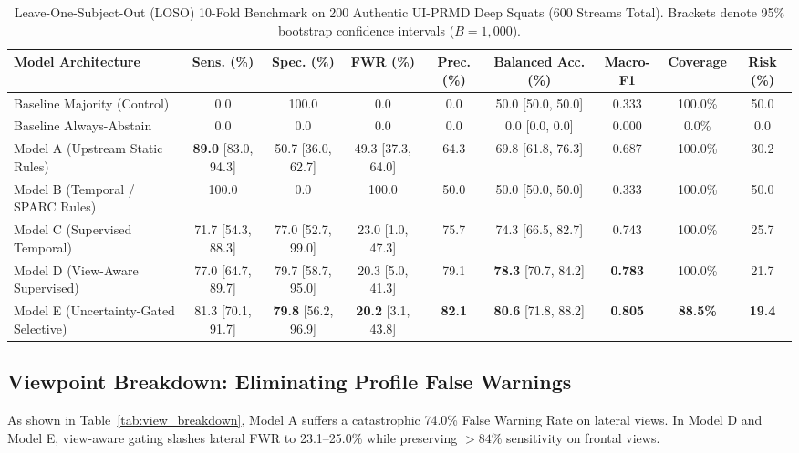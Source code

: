 \documentclass[10pt,journal,compsoc]{IEEEtran}
\begin{document}
\begin{table}[t]
\centering
\caption{Leave-One-Subject-Out (LOSO) 10-Fold Benchmark on 200 Authentic UI-PRMD Deep Squats (600 Streams Total). Brackets denote 95\% bootstrap confidence intervals ($B=1,000$).}
\label{tab:loso_benchmark}
\small
\begin{tabular}{lcccccccc}
\toprule
\textbf{Model Architecture} & \textbf{Sens. (\%)} & \textbf{Spec. (\%)} & \textbf{FWR (\%)} & \textbf{Prec. (\%)} & \textbf{Balanced Acc. (\%)} & \textbf{Macro-F1} & \textbf{Coverage} & \textbf{Risk (\%)} \\
\midrule
Baseline Majority (Control) & 0.0 & 100.0 & 0.0 & 0.0 & 50.0 [50.0, 50.0] & 0.333 & 100.0\% & 50.0 \\
Baseline Always-Abstain & 0.0 & 0.0 & 0.0 & 0.0 & 0.0 [0.0, 0.0] & 0.000 & 0.0\% & 0.0 \\
Model A (Upstream Static Rules) & \textbf{89.0} [83.0, 94.3] & 50.7 [36.0, 62.7] & 49.3 [37.3, 64.0] & 64.3 & 69.8 [61.8, 76.3] & 0.687 & 100.0\% & 30.2 \\
Model B (Temporal / SPARC Rules) & 100.0 & 0.0 & 100.0 & 50.0 & 50.0 [50.0, 50.0] & 0.333 & 100.0\% & 50.0 \\
Model C (Supervised Temporal) & 71.7 [54.3, 88.3] & 77.0 [52.7, 99.0] & 23.0 [1.0, 47.3] & 75.7 & 74.3 [66.5, 82.7] & 0.743 & 100.0\% & 25.7 \\
Model D (View-Aware Supervised) & 77.0 [64.7, 89.7] & 79.7 [58.7, 95.0] & 20.3 [5.0, 41.3] & 79.1 & \textbf{78.3} [70.7, 84.2] & \textbf{0.783} & 100.0\% & 21.7 \\
Model E (Uncertainty-Gated Selective) & 81.3 [70.1, 91.7] & \textbf{79.8} [56.2, 96.9] & \textbf{20.2} [3.1, 43.8] & \textbf{82.1} & \textbf{80.6} [71.8, 88.2] & \textbf{0.805} & \textbf{88.5\%} & \textbf{19.4} \\
\bottomrule
\end{tabular}
\end{table}

\subsection{Viewpoint Breakdown: Eliminating Profile False Warnings}
As shown in Table~\ref{tab:view_breakdown}, Model A suffers a catastrophic 74.0\% False Warning Rate on lateral views. In Model D and Model E, view-aware gating slashes lateral FWR to 23.1--25.0\% while preserving $>84\%$ sensitivity on frontal views.
\end{document}

